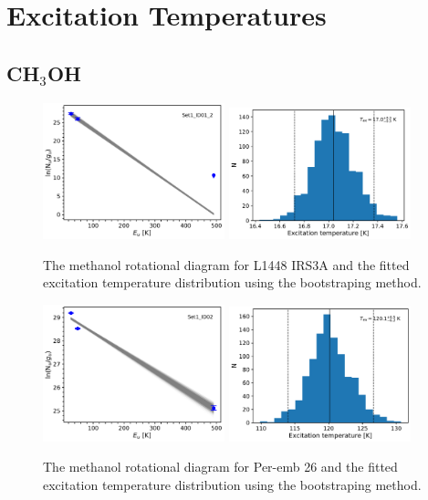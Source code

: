\documentclass[twocolumn]{aastex62}
\newcommand{\methanol}{\mbox{CH$_{3}$OH}}
\begin{document}
\section{Excitation Temperatures}
\subsection{\methanol}

\begin{figure}[htbp!]
  \centering
  \includegraphics[width=0.47\textwidth]{Set1_ID01_2.pdf}
  \includegraphics[width=0.47\textwidth]{Set1_ID01_2_rot_temps.pdf}
  \caption{The methanol rotational diagram for L1448 IRS3A and the fitted excitation temperature distribution using the bootstraping method.}
  \label{}
\end{figure}

\begin{figure}[htbp!]
  \centering
  \includegraphics[width=0.47\textwidth]{Set1_ID02.pdf}
  \includegraphics[width=0.47\textwidth]{Set1_ID02_rot_temps.pdf}
  \caption{The methanol rotational diagram for Per-emb 26 and the fitted excitation temperature distribution using the bootstraping method.}
  \label{}
\end{figure}
\end{document}
